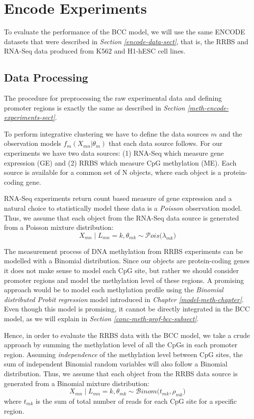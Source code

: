 \section{Encode Experiments} \label{integr-encode-exper-sect}
To evaluate the performance of the BCC model, we will use the same ENCODE datasets that were described in \emph{Section \ref{encode-data-sect}}, that is, the RRBS and RNA-Seq data produced from K562 and H1-hESC cell lines.

\subsection{Data Processing}
The procedure for preprocessing the raw experimental data and defining promoter regions is exactly the same as described in \emph{Section \ref{meth-encode-experiments-sect}}. 

To perform integrative clustering we have to define the data sources $m$ and the observation models $f_{m}(X_{mn}|\theta_{m})$ that each data source follows. 
For our experiments we have two data sources: (1) RNA-Seq which measure gene expression (GE) and (2) RRBS which measure CpG methylation (ME). Each source is available for a common set of N objects, where each object is a protein-coding gene.

RNA-Seq experiments return count based measure of gene expression and a natural choice to statistically model these data is a \emph{Poisson} observation model. Thus, we assume that each object from the RNA-Seq data source is generated from a Poisson mixture distribution:
\begin{equation}
	X_{mn} \mid L_{mn} = k, \theta_{mk} \sim \mathcal{P}ois\big(\lambda_{mk}\big)
\end{equation}

The measurement process of DNA methylation from RRBS experiments can be modelled with a Binomial distribution. Since our objects are protein-coding genes it does not make sense to model each CpG site, but rather we should consider promoter regions and model the methylation level of these regions. A promising approach would be to model each methylation profile using the \emph{Binomial distributed Probit regression} model introduced in \emph{Chapter \ref{model-meth-chapter}}. Even though this model is promising, it cannot be directly integrated in the BCC model, as we will explain in \emph{Section \ref{conc-meth-prof-bcc-subsect}}.

Hence, in order to evaluate the RRBS data with the BCC model, we take a crude approach by summing the methylation level of all the CpGs in each promoter region. Assuming \emph{independence} of the methylation level between CpG sites, the sum of independent Binomial random variables will also follow a Binomial distribution. Thus, we assume that each object from the RRBS data source is generated from a Binomial mixture distribution:
\begin{equation}
	X_{mn} \mid L_{mn} = k, \theta_{mk} \sim \mathcal{B}inom\big(t_{mk}, \rho_{mk}\big)
\end{equation}
where $t_{mk}$ is the sum of total number of reads for each CpG site for a specific region.

